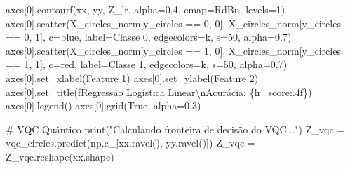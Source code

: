 \documentclass[
  brazilian,
]{report}
\newenvironment{Shaded}{\begin{snugshade}}{\end{snugshade}}
\newcommand{\BuiltInTok}[1]{\textcolor[rgb]{0.00,0.23,0.31}{#1}}
\newcommand{\CharTok}[1]{\textcolor[rgb]{0.13,0.47,0.30}{#1}}
\newcommand{\CommentTok}[1]{\textcolor[rgb]{0.37,0.37,0.37}{#1}}
\newcommand{\DecValTok}[1]{\textcolor[rgb]{0.68,0.00,0.00}{#1}}
\newcommand{\FloatTok}[1]{\textcolor[rgb]{0.68,0.00,0.00}{#1}}
\newcommand{\NormalTok}[1]{\textcolor[rgb]{0.00,0.23,0.31}{#1}}
\newcommand{\OperatorTok}[1]{\textcolor[rgb]{0.37,0.37,0.37}{#1}}
\newcommand{\SpecialCharTok}[1]{\textcolor[rgb]{0.37,0.37,0.37}{#1}}
\newcommand{\SpecialStringTok}[1]{\textcolor[rgb]{0.13,0.47,0.30}{#1}}
\newcommand{\StringTok}[1]{\textcolor[rgb]{0.13,0.47,0.30}{#1}}
\newcommand{\VariableTok}[1]{\textcolor[rgb]{0.07,0.07,0.07}{#1}}
\begin{document}
\begin{tcolorbox}
\begin{Shaded}
\begin{Highlighting}[]
\NormalTok{axes[}\DecValTok{0}\NormalTok{].contourf(xx, yy, Z\_lr, alpha}\OperatorTok{=}\FloatTok{0.4}\NormalTok{, cmap}\OperatorTok{=}\StringTok{\textquotesingle{}RdBu\textquotesingle{}}\NormalTok{, levels}\OperatorTok{=}\DecValTok{1}\NormalTok{)}
\NormalTok{axes[}\DecValTok{0}\NormalTok{].scatter(X\_circles\_norm[y\_circles }\OperatorTok{==} \DecValTok{0}\NormalTok{, }\DecValTok{0}\NormalTok{], X\_circles\_norm[y\_circles }\OperatorTok{==} \DecValTok{0}\NormalTok{, }\DecValTok{1}\NormalTok{], }
\NormalTok{               c}\OperatorTok{=}\StringTok{\textquotesingle{}blue\textquotesingle{}}\NormalTok{, label}\OperatorTok{=}\StringTok{\textquotesingle{}Classe 0\textquotesingle{}}\NormalTok{, edgecolors}\OperatorTok{=}\StringTok{\textquotesingle{}k\textquotesingle{}}\NormalTok{, s}\OperatorTok{=}\DecValTok{50}\NormalTok{, alpha}\OperatorTok{=}\FloatTok{0.7}\NormalTok{)}
\NormalTok{axes[}\DecValTok{0}\NormalTok{].scatter(X\_circles\_norm[y\_circles }\OperatorTok{==} \DecValTok{1}\NormalTok{, }\DecValTok{0}\NormalTok{], X\_circles\_norm[y\_circles }\OperatorTok{==} \DecValTok{1}\NormalTok{, }\DecValTok{1}\NormalTok{], }
\NormalTok{               c}\OperatorTok{=}\StringTok{\textquotesingle{}red\textquotesingle{}}\NormalTok{, label}\OperatorTok{=}\StringTok{\textquotesingle{}Classe 1\textquotesingle{}}\NormalTok{, edgecolors}\OperatorTok{=}\StringTok{\textquotesingle{}k\textquotesingle{}}\NormalTok{, s}\OperatorTok{=}\DecValTok{50}\NormalTok{, alpha}\OperatorTok{=}\FloatTok{0.7}\NormalTok{)}
\NormalTok{axes[}\DecValTok{0}\NormalTok{].set\_xlabel(}\StringTok{\textquotesingle{}Feature 1\textquotesingle{}}\NormalTok{)}
\NormalTok{axes[}\DecValTok{0}\NormalTok{].set\_ylabel(}\StringTok{\textquotesingle{}Feature 2\textquotesingle{}}\NormalTok{)}
\NormalTok{axes[}\DecValTok{0}\NormalTok{].set\_title(}\SpecialStringTok{f\textquotesingle{}Regressão Logística Linear}\CharTok{\textbackslash{}n}\SpecialStringTok{Acurácia: }\SpecialCharTok{\{}\NormalTok{lr\_score}\SpecialCharTok{:.4f\}}\SpecialStringTok{\textquotesingle{}}\NormalTok{)}
\NormalTok{axes[}\DecValTok{0}\NormalTok{].legend()}
\NormalTok{axes[}\DecValTok{0}\NormalTok{].grid(}\VariableTok{True}\NormalTok{, alpha}\OperatorTok{=}\FloatTok{0.3}\NormalTok{)}

\CommentTok{\# VQC Quântico}
\BuiltInTok{print}\NormalTok{(}\StringTok{"Calculando fronteira de decisão do VQC..."}\NormalTok{)}
\NormalTok{Z\_vqc }\OperatorTok{=}\NormalTok{ vqc\_circles.predict(np.c\_[xx.ravel(), yy.ravel()])}
\NormalTok{Z\_vqc }\OperatorTok{=}\NormalTok{ Z\_vqc.reshape(xx.shape)}


\end{Highlighting}
\end{Shaded}
\end{tcolorbox}
\end{document}
